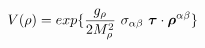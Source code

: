 \begin{equation}
V(\rho)=exp\{ \frac{g_\rho}{2M_\rho^2}~\sigma_{\alpha\beta} ~\mbox{\boldmath$\tau$} \cdot \mbox{\boldmath$\rho$}^{\alpha\beta} \}
\end{equation}

